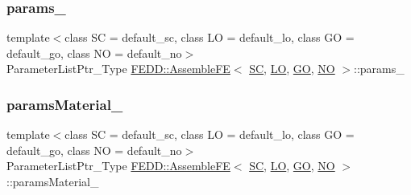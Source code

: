 \subsubsection{\texorpdfstring{params\+\_\+}{params\_}}
{\footnotesize\ttfamily template$<$class SC  = default\+\_\+sc, class LO  = default\+\_\+lo, class GO  = default\+\_\+go, class NO  = default\+\_\+no$>$ \\
Parameter\+List\+Ptr\+\_\+\+Type \hyperlink{classFEDD_1_1AssembleFE}{F\+E\+D\+D\+::\+Assemble\+FE}$<$ \hyperlink{fe__test__laplace_8cpp_a79c7e86a57edbb2a5a53242bcd04e41e}{SC}, \hyperlink{fe__test__laplace_8cpp_ad6a38c9f07d3fd633eefca5bccad8410}{LO}, \hyperlink{fe__test__laplace_8cpp_afa2946b509009b4f45eb04bd8c5b27d9}{GO}, \hyperlink{fe__test__laplace_8cpp_a5e24f37b28787429872b6ecb1d0417ce}{NO} $>$\+::params\+\_\+\hspace{0.3cm}{\ttfamily [protected]}}

\mbox{\label{classFEDD_1_1AssembleFE_ac270e80971846b789e7cb2507fe345ba}} 
\subsubsection{\texorpdfstring{params\+Material\+\_\+}{paramsMaterial\_}}
{\footnotesize\ttfamily template$<$class SC  = default\+\_\+sc, class LO  = default\+\_\+lo, class GO  = default\+\_\+go, class NO  = default\+\_\+no$>$ \\
Parameter\+List\+Ptr\+\_\+\+Type \hyperlink{classFEDD_1_1AssembleFE}{F\+E\+D\+D\+::\+Assemble\+FE}$<$ \hyperlink{fe__test__laplace_8cpp_a79c7e86a57edbb2a5a53242bcd04e41e}{SC}, \hyperlink{fe__test__laplace_8cpp_ad6a38c9f07d3fd633eefca5bccad8410}{LO}, \hyperlink{fe__test__laplace_8cpp_afa2946b509009b4f45eb04bd8c5b27d9}{GO}, \hyperlink{fe__test__laplace_8cpp_a5e24f37b28787429872b6ecb1d0417ce}{NO} $>$\+::params\+Material\+\_\+\hspace{0.3cm}{\ttfamily [protected]}}

\mbox{\label{classFEDD_1_1AssembleFE_a2c3232bc8b6d6d9e23ab0a745e103e2a}} 
